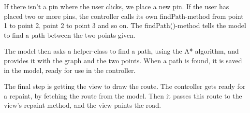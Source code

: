 If there isn't a pin where the user clicks, we place a new pin. If the user has placed two or 
more pins, the controller calls its own findPath-method from point 1 to point 2, point 2 to 
point 3 and so on. The findPath()-method tells the model to find a path between the two 
points given.

The model then asks a helper-class to find a path, using the A* algorithm, and provides it 
with the graph and the two points. When a path is found, it is saved in the model, ready 
for use in the controller.

The final step is getting the view to draw the route. The controller gets ready for a repaint, 
by fetching the route from the model. Then it passes this route to the view's repaint-method, 
and the view paints the road.